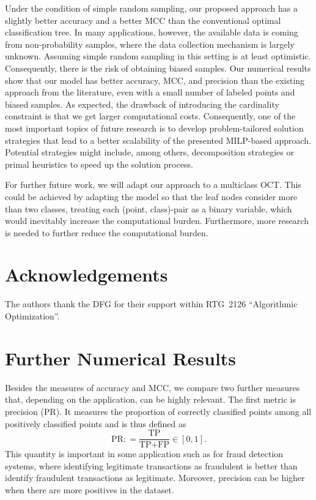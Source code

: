 \documentclass[a4paper,american,reqno]{amsart}
\newcommand{\define}{\mathrel{{\mathop:}{=}}}
\newcommand{\TP}{\text{TP}}
\newcommand{\FP}{\text{FP}}
\newcommand{\PR}{\text{PR}}
\newcommand{\MCC}{\text{MCC}}
\newcommand{\rev}[1]{#1}
\begin{document}
Under the condition of simple random sampling, our proposed approach
has a slightly better accuracy and a better $\MCC$ than the
conventional optimal classification tree.
In many applications, however, the available data is coming from
non-probability samples, where the data collection mechanism is
largely unknown. Assuming simple random sampling in this setting is at
least optimistic.
Consequently, there is the risk of obtaining biased samples.
Our numerical results show that our model has better accuracy, $\MCC$,
and precision than the existing approach from the literature, even
with a small number of labeled points and biased samples. As expected,
the drawback of introducing the cardinality constraint is that we get
larger computational costs.
\rev{Consequently, one of the most important topics of future research
  is to develop problem-tailored solution strategies that lead to a
  better scalability of the presented MILP-based approach.
  Potential strategies might include, among others, decomposition
  strategies or primal heuristics to speed up the solution process.}

For \rev{further} future work, we will adapt our approach to a
multiclass OCT.
\rev{This could be achieved by adapting the model so that the leaf
  nodes consider more than two classes, treating each (point,
  class)-pair as a binary variable, which would inevitably increase the
  computational burden.}
Furthermore, more research is needed to further reduce the
computational burden.




\section*{Acknowledgements}

The authors thank the DFG for their support within RTG~2126
\enquote{Algorithmic Optimization}.




\printbibliography

\appendix
\section{Further Numerical Results}
\label{sec:furth-numer-results}

Besides the measures of accuracy and $\MCC$, we compare two further
measures that, depending on the application, can be highly relevant.
The first metric is precision ($\PR$).
It measures the proportion of correctly classified points among all
positively classified points and is thus defined as
\begin{equation}
  \label{prec}
  \PR \define \frac{\TP}{\TP + \FP} \in [0,1].
\end{equation}
This quantity is important in some application such as for fraud detection
systems, where identifying legitimate transactions as fraudulent is
better than identify fraudulent transactions as legitimate. Moreover,
precision can be higher when there are more positives in the dataset.
\end{document}
